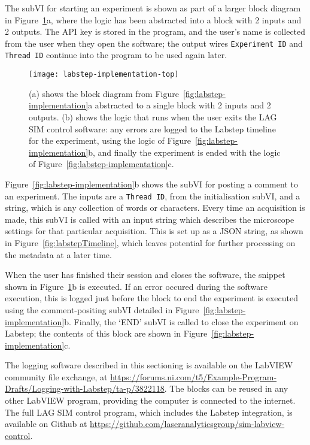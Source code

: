 The subVI for starting an experiment is shown as part of a larger block diagram in Figure~\ref{fig:labstep-implementation-top}a, where the logic has been abstracted into a block with 2 inputs and 2 outputs. 
The API key is stored in the program, and the user's name is collected from the user when they open the software; the output wires \texttt{Experiment ID} and \texttt{Thread ID} continue into the program to be used again later. 

\begin{figure}[tbp]
\centering
\texttt{[image: labstep-implementation-top]}
\caption[Top-level LabVIEW functions for uploading to Labstep]{(a) shows the block diagram from Figure~\ref{fig:labstep-implementation}a abstracted to a single block with 2 inputs and 2 outputs. (b) shows the logic that runs when the user exits the LAG SIM control software: any errors are logged to the Labstep timeline for the experiment, using the logic of Figure~\ref{fig:labstep-implementation}b, and finally the experiment is ended with the logic of Figure~\ref{fig:labstep-implementation}c. } 
\label{fig:labstep-implementation-top}
\end{figure}

Figure~\ref{fig:labstep-implementation}b shows the subVI for posting a comment to an experiment.
The inputs are a \texttt{Thread ID}, from the initialisation subVI, and a string, which is any collection of words or characters.
Every time an acquisition is made, this subVI is called with an input string which describes the microscope settings for that particular acquisition. 
This is set up as a JSON string, as shown in Figure~\ref{fig:labstepTimeline}, which leaves potential for further processing on the metadata at a later time. 

When the user has finished their session and closes the software, the snippet shown in Figure~\ref{fig:labstep-implementation-top}b is executed. 
If an error occured during the software execution, this is logged just before the block to end the experiment is executed using the comment-positing subVI detailed in Figure~\ref{fig:labstep-implementation}b. 
Finally, the `END' subVI is called to close the experiment on Labstep; the contents of this block are shown in Figure~\ref{fig:labstep-implementation}c. 

The logging software described in this sectioning is available on the LabVIEW community file exchange, at \url{https://forums.ni.com/t5/Example-Program-Drafts/Logging-with-Labstep/ta-p/3822118}. 
The blocks can be reused in any other LabVIEW program, providing the computer is connected to the internet. 
The full LAG SIM control program, which includes the Labstep integration, is available on Github at \url{https://github.com/laseranalyticsgroup/sim-labview-control}. 

